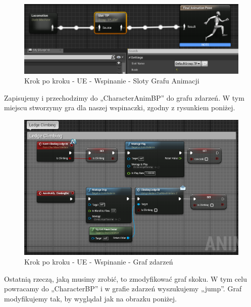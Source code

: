 \documentclass[openright]{xmgr}
\begin{document}
\begin{figure}[!htb]
    \begin{center}
    \includegraphics[scale=0.5]{Screeny/UeKrokPoKroku/AnimGraphSlot}
    \end{center}
    \caption{Krok po kroku - UE - Wspinanie - Sloty Grafu Animacji}
\end{figure}
\newpage
Zapisujemy i przechodzimy do „CharacterAnimBP” do grafu zdarzeń. W tym miejscu stworzymy gra dla naszej wspinaczki, zgodny z rysunkiem poniżej.

\begin{figure}[!htb]
    \begin{center}
    \includegraphics[scale=0.5]{Screeny/UeKrokPoKroku/LedgeClimbingGraph}
    \end{center}
    \caption{Krok po kroku - UE - Wspinanie - Graf zdarzeń}
\end{figure}

Ostatnią rzeczą, jaką musimy zrobić, to zmodyfikować graf skoku. W tym celu powracamy do „CharacterBP” i w grafie zdarzeń wyszukujemy „jump”. Graf modyfikujemy tak, by wyglądał jak na obrazku poniżej.
\end{document}
